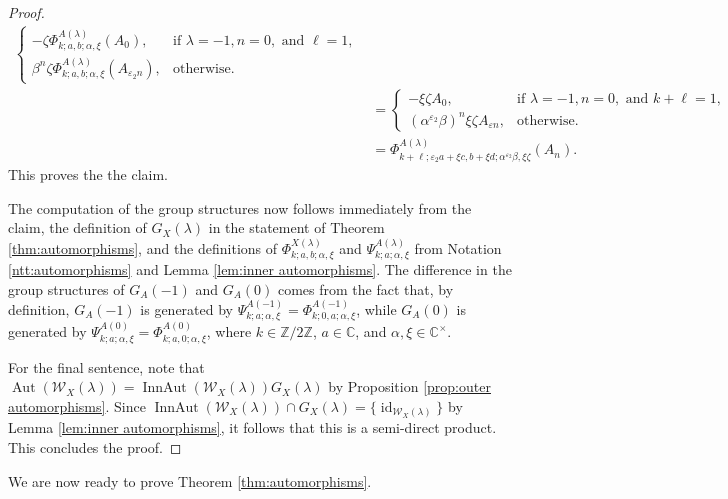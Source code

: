 \documentclass[11pt, svgnames]{amsart}
\newcommand{\ZZ}{\mathbb{Z}}
\newcommand{\CC}{\mathbb{C}}
\newcommand{\W}{\mathcal{W}}
\DeclareMathOperator{\id}{id}
\DeclareMathOperator{\Aut}{Aut}
\DeclareMathOperator{\InnAut}{InnAut}
\theoremstyle{definition}
\begin{document}
\begin{proof}
\begin{align*}
\begin{cases}
            -\zeta \Phi_{k;a,b;\alpha,\xi}^{A(\lambda)}(A_0), &\text{if } \lambda = -1, n = 0, \text{ and } \ell = 1, \\
            \beta^n \zeta \Phi_{k;a,b;\alpha,\xi}^{A(\lambda)}(A_{\varepsilon_2 n}), &\text{otherwise}.
        \end{cases} \\
        &= \begin{cases}
            -\xi \zeta A_0, &\text{if } \lambda = -1, n = 0, \text{ and } k + \ell = 1, \\
            (\alpha^{\varepsilon_2}\beta)^n \xi \zeta A_{\varepsilon n}, &\text{otherwise}.
        \end{cases} \\
        &= \Phi_{k+\ell; \varepsilon_2 a + \xi c, b + \xi d; \alpha^{\varepsilon_2} \beta, \xi \zeta}^{A(\lambda)}(A_n).
    \end{align*}
    This proves the the claim.
    
    The computation of the group structures now follows immediately from the claim, the definition of $G_X(\lambda)$ in the statement of Theorem \ref{thm:automorphisms}, and the definitions of $\Phi_{k;a,b;\alpha,\xi}^{X(\lambda)}$ and $\Psi_{k;a;\alpha,\xi}^{A(\lambda)}$ from Notation \ref{ntt:automorphisms} and Lemma \ref{lem:inner automorphisms}. The difference in the group structures of $G_A(-1)$ and $G_A(0)$ comes from the fact that, by definition, $G_A(-1)$ is generated by $\Psi_{k;a;\alpha,\xi}^{A(-1)} = \Phi_{k;0,a;\alpha,\xi}^{A(-1)}$, while $G_A(0)$ is generated by $\Psi_{k;a;\alpha,\xi}^{A(0)} = \Phi_{k;a,0;\alpha,\xi}^{A(0)}$, where $k \in \ZZ/2\ZZ$, $a \in \CC$, and $\alpha, \xi \in \CC^\times$.

    For the final sentence, note that $\Aut(\W_X(\lambda)) = \InnAut(\W_X(\lambda)) G_X(\lambda)$ by Proposition \ref{prop:outer automorphisms}. Since $\InnAut(\W_X(\lambda)) \cap G_X(\lambda) = \{\id_{\W_X(\lambda)}\}$ by Lemma \ref{lem:inner automorphisms}, it follows that this is a semi-direct product. This concludes the proof.
\end{proof}

We are now ready to prove Theorem \ref{thm:automorphisms}.
\end{document}
